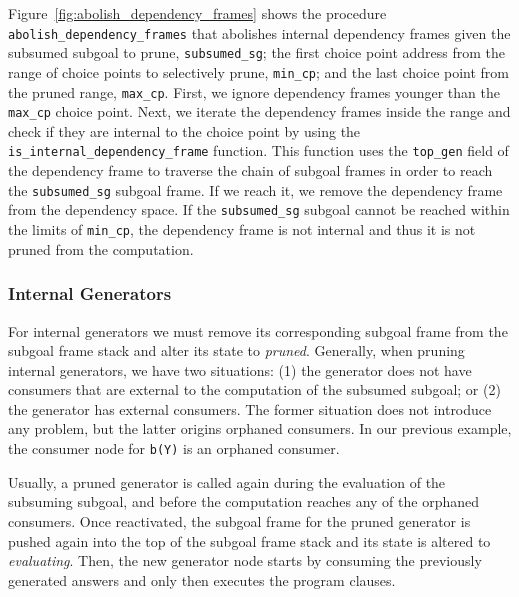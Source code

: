 Figure~\ref{fig:abolish_dependency_frames} shows the procedure \texttt{abolish\_dependency\_frames}
that abolishes internal dependency frames given the subsumed subgoal to prune, \texttt{subsumed\_sg}; the first choice
point address from the range of choice points to selectively prune, \texttt{min\_cp};
and the last choice point from the pruned range, \texttt{max\_cp}. First, we ignore dependency frames younger
than the \texttt{max\_cp} choice point.
Next, we iterate the dependency frames inside the range and check if they are internal to the choice point
by using the \texttt{is\_internal\_dependency\_frame} function. This function uses the \texttt{top\_gen}
field of the dependency frame to traverse the chain of subgoal frames in order to reach the \texttt{subsumed\_sg}
subgoal frame. If we reach it, we remove the dependency frame from the dependency space. If the \texttt{subsumed\_sg}
subgoal cannot be reached within the limits of \texttt{min\_cp}, the dependency frame is not internal and thus it is
not pruned from the computation.

\subsubsection{Internal Generators}

For internal generators we must remove its corresponding subgoal frame
from the subgoal frame stack and alter its state to \emph{pruned}. Generally, when pruning internal generators, we
have two situations: (1) the generator does not have consumers that are external to the computation of the
subsumed subgoal; or (2) the generator has external consumers. The former situation does not introduce any
problem, but the latter origins orphaned consumers. In our previous example, the consumer node for \texttt{b(Y)} is
an orphaned consumer.

Usually, a pruned generator is called again during the evaluation of the subsuming subgoal, and before
the computation reaches any of the orphaned consumers. Once reactivated, the subgoal frame for the pruned
generator is pushed again into the top of the subgoal frame stack and its state is altered to
\textit{evaluating}. Then, the new generator node starts by consuming the previously generated answers
and only then executes the program clauses.

